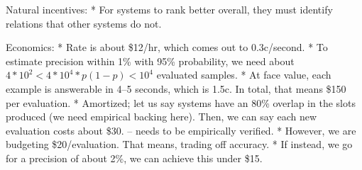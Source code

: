 Natural incentives:
* For systems to rank better overall, they must identify relations that other systems do not.

Economics:
  * Rate is about \$12/hr, which comes out to 0.3c/second.
  * To estimate precision within 1\% with 95\% probability, we need about $4*10^2 < 4 * 10^4 * p (1-p) < 10^4$ evaluated samples.
  * At face value, each example is answerable in 4--5 seconds, which is 1.5c. In total, that means \$150 per evaluation.
  * Amortized; let us say systems have an 80\% overlap in the slots produced (we need empirical backing here). Then, we can say each new evaluation costs about \$30. -- needs to be empirically verified.
  * However, we are budgeting \$20/evaluation. That means, trading off accuracy.
  * If instead, we go for a precision of about 2\%, we can achieve this under \$15.
